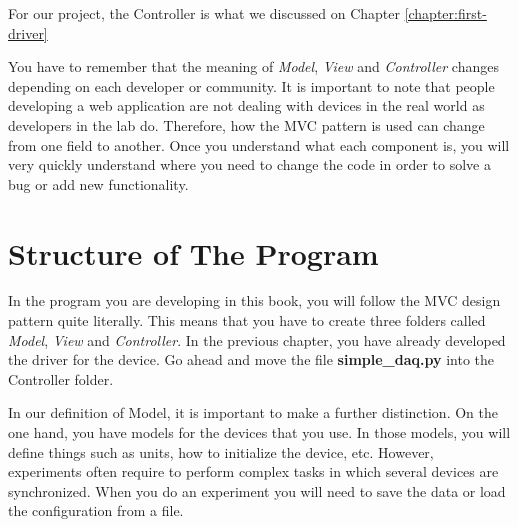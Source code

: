 For our project, the Controller is what we discussed on Chapter \ref{chapter:first-driver}


You have to remember that the meaning of \emph{Model}, \emph{View} and \emph{Controller} changes depending on each developer or community. It
is important to note that people developing a web application are not dealing with devices in the real world as developers in the lab do. Therefore, how the {MVC} pattern is used can change from one field to another. Once you understand what each component is, you will very quickly understand where you need to change the code in order to solve a bug or add new functionality. 

\section{Structure of The Program}\label{structure-of-theprogram}
In the program you are developing in this book, you will follow the {MVC} design pattern quite literally. This means that you have to create
three folders called \emph{Model}, \emph{View} and \emph{Controller}. In the previous chapter, you have already developed the driver for the device. Go ahead and move the file \textbf{simple\_daq.py} into the Controller folder.


In our definition of Model, it is important to make a further distinction. On the one hand, you have models for the devices that you use. In those models, you will define things such as units, how to initialize the device, etc. However, experiments often require to perform complex tasks in which several devices are synchronized. When you do an experiment you will need to save the data or load the configuration from a file. 

